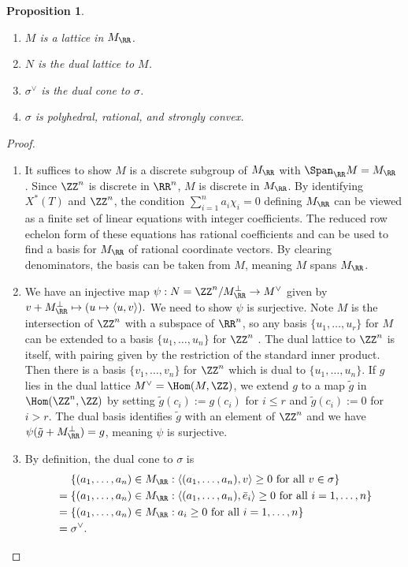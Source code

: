 \documentclass[12pt]{amsart}
\theoremstyle{plain}
\newtheorem{proposition}[theorem]{Proposition}
\theoremstyle{definition}
\begin{document}
\begin{proposition}
\begin{enumerate}
\item $M$ is a lattice in $M_\RR$.
\item $N$ is the dual lattice to $M$.
\item $\sigma^\vee$ is the dual cone to $\sigma$.
\item $\sigma$ is polyhedral, rational, and strongly convex.
\end{enumerate}
\end{proposition}
\begin{proof}
\begin{enumerate}
\item
It suffices to show $M$ is a discrete subgroup of $M_\RR$ with $\Span_\RR M = M_\RR$ \cite[\S 2.2]{Serre73}.
Since $\ZZ^n$ is discrete in $\RR^n$, $M$ is discrete in $M_\RR$.
By identifying $X^*(T)$ and $\ZZ^n$, the condition $\sum_{i=1}^n a_i \chi_i = 0$ defining $M_\RR$ can be viewed as a finite set of linear equations with integer coefficients.
The reduced row echelon form of these equations has rational coefficients and can be used to find a basis for $M_\RR$ of rational coordinate vectors.
By clearing denominators, the basis can be taken from $M$, meaning $M$ spans $M_\RR$.

\item
We have an injective map $\psi : N=\ZZ^n/M_\RR^\perp \to M^\vee$ given by $v + M_\RR^\perp \mapsto (u \mapsto \langle u, v\rangle).$
We need to show $\psi$ is surjective.
Note $M$ is the intersection of $\ZZ^n$ with a subspace of $\RR^n$, so any basis $\{u_1, \ldots, u_r\}$ for $M$ can be extended to a basis $\{u_1, \ldots, u_n\}$ for $\ZZ^n$ \cite[I.2, Corollary 3]{Cassels97}.
The dual lattice to $\ZZ^n$ is itself, with pairing given by the restriction of the standard inner product. 
Then there is a basis $\{v_1, \ldots, v_n\}$ for $\ZZ^n$ which is dual to $\{u_1, \ldots, u_n\}$.
If $g$ lies in the dual lattice $M^\vee = \Hom(M, \ZZ)$, we extend $g$ to a map $\tilde g$ in $\Hom(\ZZ^n, \ZZ)$ by setting $\tilde g(c_i) := g(c_i)$ for $i \le r$ and $\tilde g(c_i) := 0$ for $i > r$.
The dual basis identifies $\tilde g$ with an element of $\ZZ^n$ and we have $\psi(\tilde g +M_\RR^\perp) = g$, meaning $\psi$ is surjective.

\item
By definition, the dual cone to $\sigma$ is
\begin{align*}
	&\quad \, \left\{(a_1, \ldots, a_n) \in M_\RR : \langle (a_1, \ldots, a_n), v \rangle \ge 0 \text{ for all } v \in \sigma\right\} \\
	&= \left\{(a_1, \ldots, a_n) \in M_\RR : \langle (a_1, \ldots, a_n), \bar e_i \rangle \ge 0 \text{ for all } i=1, \ldots, n \right\} \\
	&= \left\{(a_1, \ldots, a_n) \in M_\RR : a_i \ge 0 \text{ for all } i=1, \ldots, n \right\} \\
	&= \sigma^\vee.
\end{align*}


\end{enumerate}
\end{proof}
\end{document}
